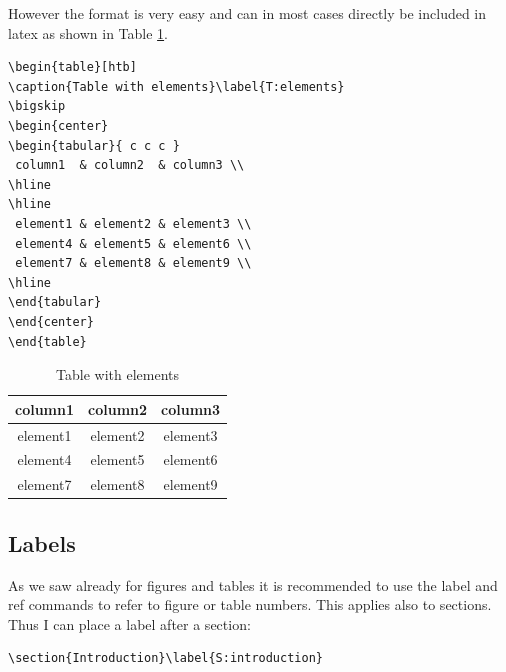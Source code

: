 
However the format is very easy and can in most cases directly be
included in latex as shown in Table \ref{T:elements}.

\begin{verbatim}
\begin{table}[htb]
\caption{Table with elements}\label{T:elements}
\bigskip
\begin{center}
\begin{tabular}{ c c c }
 column1  & column2  & column3 \\
\hline
\hline
 element1 & element2 & element3 \\ 
 element4 & element5 & element6 \\  
 element7 & element8 & element9 \\
\hline
\end{tabular}
\end{center}
\end{table}
\end{verbatim}

\begin{table}[htb]
\caption{Table with elements}\label{T:elements}
\bigskip
\begin{center}
\begin{tabular}{ c c c }
 column1  & column2  & column3 \\
\hline
\hline
 element1 & element2 & element3 \\ 
 element4 & element5 & element6 \\  
 element7 & element8 & element9 \\
\hline
\end{tabular}
\end{center}
\end{table}

\subsection{Labels}\label{labels}

As we saw already for figures and tables it is recommended to use the
label and ref commands to refer to figure or table numbers. This applies
also to sections. Thus I can place a label after a section:

\begin{verbatim}
\section{Introduction}\label{S:introduction}
\end{verbatim}

